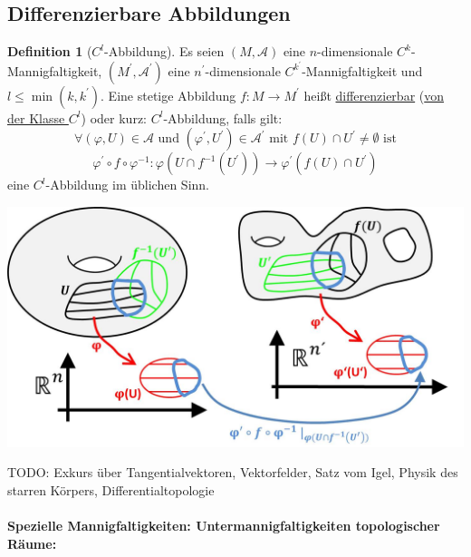 \documentclass[a4paper,11pt,notitlepage]{report}
\theoremstyle{remark}
\theoremstyle{definition}
\newtheorem{definition}{Definition}[chapter]
\begin{document}
\subsection{Differenzierbare Abbildungen}
\begin{definition}[$C^l$-Abbildung]
Es seien $(M, \mathcal{A})$ eine $n$-dimensionale $C^k$-Mannigfaltigkeit, $(M^\prime, \mathcal{A}^\prime)$ eine $n^\prime$-dimensionale $C^{k^\prime}$-Mannigfaltigkeit und $l \leq \min(k,k^\prime)$. Eine stetige Abbildung $f \colon M \rightarrow M^\prime$ heißt \underline{differenzierbar} (\underline{von der Klasse $C^l$}) oder kurz: $C^l$-Abbildung, falls gilt:
$$\forall (\varphi,U) \in \mathcal{A} \text{ und } (\varphi^\prime, U^\prime) \in \mathcal{A}^\prime \text{ mit } f(U) \cap U^\prime \neq \emptyset \text{ ist}$$
$$\boxed{\varphi^\prime \circ f \circ \varphi^{-1} \colon \varphi(U \cap f^{-1}(U^\prime)) \rightarrow \varphi^\prime(f(U)\cap U^\prime)}$$
eine $C^l$-Abbildung im üblichen Sinn.
\end{definition}
\begin{center}
	\includegraphics[scale=0.5]{images/Abb_diffbar.jpg}
\end{center}

TODO: Exkurs über Tangentialvektoren, Vektorfelder, Satz vom Igel, Physik des starren Körpers, Differentialtopologie

\newpage 
\paragraph{
Spezielle Mannigfaltigkeiten: Untermannigfaltigkeiten topologischer Räume: }
 
\end{document}
